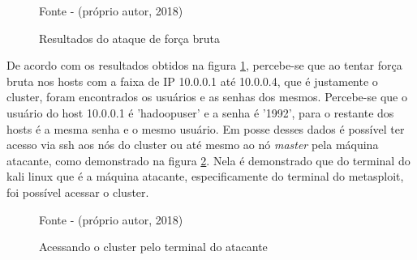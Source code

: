 \begin{figure}[htbp!] \begin{center}
\caption{Resultados do ataque de força bruta}
\small{Fonte - (próprio autor, 2018)}
\label{Fig:Resultados do ataque de força bruta}
\end{center} \end{figure}

De acordo com os resultados obtidos na figura \ref{Fig:Resultados do ataque de força bruta}, percebe-se que ao tentar força bruta nos hosts com a faixa de IP 10.0.0.1 até 10.0.0.4, que é justamente o cluster, foram encontrados os usuários e as senhas dos mesmos. Percebe-se que o usuário do host 10.0.0.1 é 'hadoopuser' e a senha é '1992', para o restante dos hosts é a mesma senha e o mesmo usuário. Em posse desses dados é possível ter acesso via ssh aos nós do cluster ou até mesmo ao nó \textit{master} pela máquina atacante, como demonstrado na figura \ref{Fig:AcessoClusterPeloKali}.  Nela é demonstrado que do terminal do kali linux que é a máquina atacante, especificamente do terminal do metasploit, foi possível acessar o cluster.


\begin{figure}[htbp!] \begin{center}
\caption{Acessando o cluster pelo terminal do atacante}
\small{Fonte - (próprio autor, 2018)}
\label{Fig:AcessoClusterPeloKali}
\end{center} \end{figure}

